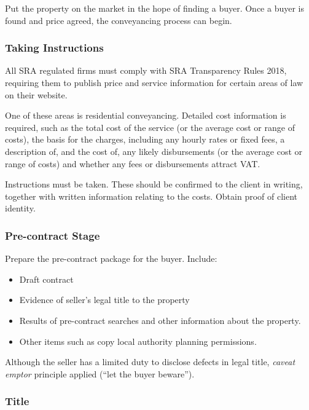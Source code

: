 \documentclass[
]{article}
\providecommand{\tightlist}{%
  \setlength{\itemsep}{0pt}\setlength{\parskip}{0pt}}
\begin{document}
Put the property on the market in the hope of finding a buyer. Once a
buyer is found and price agreed, the conveyancing process can begin.

\hypertarget{taking-instructions}{%
\subsubsection{Taking Instructions}\label{taking-instructions}}

All SRA regulated firms must comply with SRA Transparency Rules 2018,
requiring them to publish price and service information for certain
areas of law on their website.

One of these areas is residential conveyancing. Detailed cost
information is required, such as the total cost of the service (or the
average cost or range of costs), the basis for the charges, including
any hourly rates or fixed fees, a description of, and the cost of, any
likely disbursements (or the average cost or range of costs) and whether
any fees or disbursements attract VAT.

Instructions must be taken. These should be confirmed to the client in
writing, together with written information relating to the costs. Obtain
proof of client identity.

\hypertarget{pre-contract-stage}{%
\subsubsection{Pre-contract Stage}\label{pre-contract-stage}}

Prepare the pre-contract package for the buyer. Include:

\begin{itemize}
\tightlist
\item
  Draft contract
\item
  Evidence of seller's legal title to the property
\item
  Results of pre-contract searches and other information about the
  property.
\item
  Other items such as copy local authority planning permissions.
\end{itemize}

Although the seller has a limited duty to disclose defects in legal
title, \emph{caveat emptor} principle applied (``let the buyer
beware'').

\hypertarget{title}{%
\subsubsection{Title}\label{title}}
\end{document}
